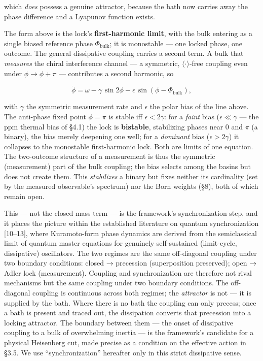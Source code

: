 \documentclass[
]{article}
\begin{document}
which \emph{does} possess a genuine attractor, because the bath now
carries away the phase difference and a Lyapunov function exists.

The form above is the lock's \textbf{first-harmonic limit}, with the
bulk entering as a single biased reference phase \(\Phi_{\text{bulk}}\);
it is monostable --- one locked phase, one outcome. The general
dissipative coupling carries a second term. A bulk that \emph{measures}
the chiral interference channel --- a symmetric,
\(\langle\cdot\rangle\)-free coupling even under \(\phi\to\phi+\pi\) ---
contributes a second harmonic, so

\[\dot\phi = \omega - \gamma\,\sin 2\phi - \epsilon\,\sin(\phi-\Phi_{\text{bulk}}),\]

with \(\gamma\) the symmetric measurement rate and \(\epsilon\) the
polar bias of the line above. The anti-phase fixed point \(\phi=\pi\) is
stable iff \(\epsilon<2\gamma\): for a \emph{faint} bias
(\(\epsilon\ll\gamma\) --- the ppm thermal bias of §4.1) the lock is
\textbf{bistable}, stabilizing phases near \(0\) and \(\pi\) (a binary),
the bias merely deepening one well; for a \emph{dominant} bias
(\(\epsilon>2\gamma\)) it collapses to the monostable first-harmonic
lock. Both are limits of one equation. The two-outcome structure of a
measurement is thus the symmetric (measurement) part of the bulk
coupling; the bias selects among the basins but does not create them.
This \emph{stabilizes} a binary but fixes neither its cardinality (set
by the measured observable's spectrum) nor the Born weights (§8), both
of which remain open.

This --- not the closed mass term --- is the framework's synchronization
step, and it places the picture within the established literature on
quantum synchronization {[}10--13{]}, where Kuramoto-form phase dynamics
are derived from the semiclassical limit of quantum master equations for
genuinely self-sustained (limit-cycle, dissipative) oscillators. The two
regimes are the same off-diagonal coupling under two boundary
conditions: closed → precession (superposition preserved); open → Adler
lock (measurement). Coupling and synchronization are therefore not rival
mechanisms but the same coupling under two boundary conditions. The
off-diagonal coupling is continuous across both regimes; the
\emph{attractor} is not --- it is supplied by the bath. Where there is
no bath the coupling can only precess; once a bath is present and traced
out, the dissipation converts that precession into a locking attractor.
The boundary between them --- the onset of dissipative coupling to a
bulk of overwhelming inertia --- is the framework's candidate for a
physical Heisenberg cut, made precise as a condition on the effective
action in §3.5. We use ``synchronization'' hereafter only in this strict
dissipative sense.
\end{document}
